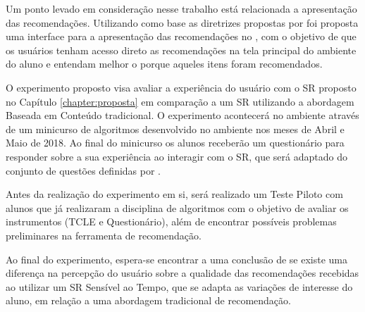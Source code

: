 Um ponto levado em consideração nesse trabalho está relacionada a apresentação das recomendações. Utilizando como base as diretrizes propostas
por  foi proposta uma interface para a apresentação das recomendações no \adaptweb,
com o objetivo de que os usuários tenham acesso direto as recomendações na tela principal do ambiente do aluno e entendam
melhor o porque aqueles itens foram recomendados.

O experimento proposto visa avaliar a experiência do usuário com o SR proposto no Capítulo \ref{chapter:proposta} em
comparação a um SR utilizando a abordagem Baseada em Conteúdo tradicional. O experimento acontecerá no ambiente
\adaptweb através de um minicurso de algoritmos desenvolvido no ambiente nos meses de
Abril e Maio de 2018. Ao final do minicurso os alunos receberão um questionário para responder sobre a sua experiência
ao interagir com o SR, que será adaptado do conjunto de questões definidas por .

Antes da realização do experimento em si, será realizado um Teste Piloto com alunos que já realizaram a disciplina de algoritmos
com o objetivo de avaliar os instrumentos (TCLE e Questionário), além de encontrar possíveis problemas preliminares na
ferramenta de recomendação.

Ao final do experimento, espera-se encontrar a uma conclusão de se existe uma diferença na percepção do usuário sobre a
qualidade das recomendações recebidas ao utilizar um SR Sensível ao Tempo, que se adapta as variações de interesse do
aluno, em relação a uma abordagem tradicional de recomendação.
